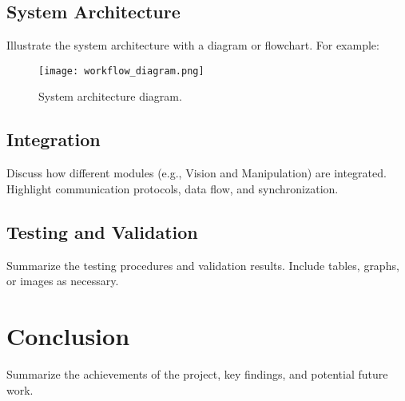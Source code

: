 \documentclass[12pt,a4paper]{article}
\begin{document}
\subsection{System Architecture}\label{subsec:systemarchitecture}
Illustrate the system architecture with a diagram or flowchart. For example:
\begin{figure}[h!]
    \centering
    \texttt{[image: workflow\_diagram.png]} %
    \caption{System architecture diagram.}
    \label{fig:workflow_diagram}
\end{figure}

\subsection{Integration}\label{subsec:integration}
Discuss how different modules (e.g., Vision and Manipulation) are integrated. Highlight communication protocols, data flow, and synchronization.

\subsection{Testing and Validation}\label{subsec:testing}
Summarize the testing procedures and validation results. Include tables, graphs, or images as necessary.

\section{Conclusion}\label{sec:conclusion}
Summarize the achievements of the project, key findings, and potential future work. 
\end{document}
